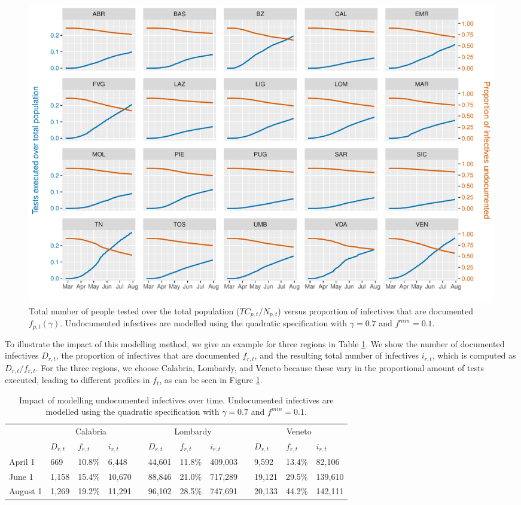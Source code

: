 \documentclass[12pt]{article}
\begin{document}
	\begin{figure}[H]
	    \centering
	    \includegraphics[width=\textwidth]{output/tamponiprop_vs_ft.pdf}
	    \caption{Total number of people tested over the total population ($TC_{p,t} / N_{p,t}$) versus proportion of infectives that are documented $f_{p,t}(\gamma)$. Undocumented infectives are modelled using the quadratic specification with $\gamma = 0.7$ and $f^{min}=0.1$.}
	    \label{fig:tamponiprop_versus_ft}
	\end{figure}
	
	To illustrate the impact of this modelling method, we give an example for three regions in Table \ref{tab:f_t_over_time}. We show the number of documented infectives $D_{r,t}$, the proportion of infectives that are documented $f_{r,t}$, and the resulting total number of infectives $i_{r,t}$, which is computed as $D_{r,t} / f_{r,t}$. For the three regions, we choose Calabria, Lombardy, and Veneto because these vary in the proportional amount of tests executed, leading to different profiles in $f_t$, as can be seen in Figure \ref{fig:tamponiprop_versus_ft}.
	
	\begin{table}[H]
		\centering
		\caption{Impact of modelling undocumented infectives over time. Undocumented infectives are modelled using the quadratic specification with $\gamma = 0.7$ and $f^{min}=0.1$.}
		\label{tab:f_t_over_time}
		\begin{tabular}{llllllllllll}
		    \toprule 
                     & \multicolumn{3}{c}{Calabria} && \multicolumn{3}{c}{Lombardy} && \multicolumn{3}{c}{Veneto} \\
                     \cmidrule{2-4}\cmidrule{6-8}\cmidrule{10-12}
                     & $D_{r,t}$  & $f_{r,t}$   & $i_{r,t}$   && $D_{r,t}$  & $f_{r,t}$   & $i_{r,t}$    && $D_{r,t}$  & $f_{r,t}$  & $i_{r,t}$   \\ \midrule
            April 1  & 669     & 10.8\%  & 6,448   && 44,601  & 11.8\%  & 409,003  && 9,592   & 13.4\% & 82,106  \\
            June 1   & 1,158   & 15.4\%  & 10,670  && 88,846  & 21.0\%  & 717,289  && 19,121  & 29.5\% & 139,610 \\
            August 1 & 1,269   & 19.2\%  & 11,291  && 96,102  & 28.5\%  & 747,691  && 20,133  & 44.2\% & 142,111 \\ \bottomrule
        \end{tabular}
	\end{table}
	
\end{document}
